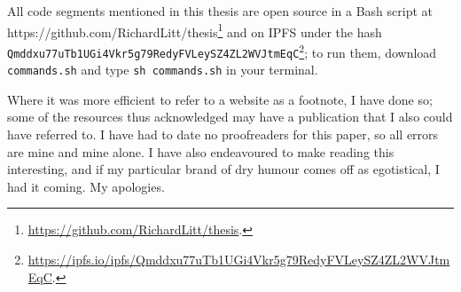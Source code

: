 All code segments mentioned in this thesis are open source in a Bash script at https://github.com/RichardLitt/thesis\footnote{\href{https://github.com/RichardLitt/thesis}{https://github.com/RichardLitt/thesis}. } and on IPFS under the hash {\tt Qmddxu77uTb1UGi4Vkr5\-g79RedyFVLeySZ4ZL\-2WVJtmEqC}\footnote{\href{https://ipfs.io/ipfs/Qmddxu77uTb1UGi4Vkr5g79RedyFVLeySZ4ZL2WVJtmEqC}{https://ipfs.io/ipfs/Qmddxu77uTb1UGi4Vkr5g79RedyFVLeySZ4ZL2WVJtmEqC}. }; to run them, download {\tt commands.sh} and type {\tt sh commands.sh} in your terminal.

Where it was more efficient to refer to a website as a footnote, I have done so; some of the resources thus acknowledged may have a publication that I also could have referred to. I have had to date no proofreaders for this paper, so all errors are mine and mine alone. I have also endeavoured to make reading this interesting, and if my particular brand of dry humour comes off as egotistical, I had it coming. My apologies.
